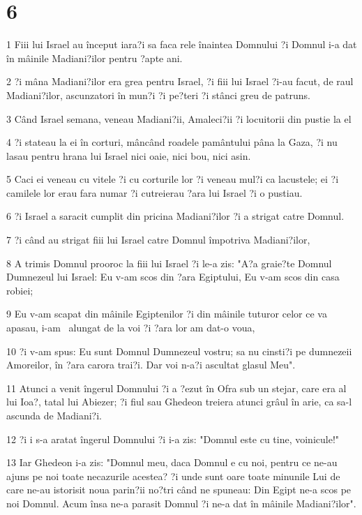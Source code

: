 \chapter{6}

\par 1 Fiii lui Israel au început iara?i sa faca rele înaintea Domnului ?i Domnul i-a dat în mâinile Madiani?ilor pentru ?apte ani.
\par 2 ?i mâna Madiani?ilor era grea pentru Israel, ?i fiii lui Israel ?i-au facut, de raul Madiani?ilor, ascunzatori în mun?i ?i pe?teri ?i stânci greu de patruns.
\par 3 Când Israel semana, veneau Madiani?ii, Amaleci?ii ?i locuitorii din pustie la el
\par 4 ?i stateau la ei în corturi, mâncând roadele pamântului pâna la Gaza, ?i nu lasau pentru hrana lui Israel nici oaie, nici bou, nici asin.
\par 5 Caci ei veneau cu vitele ?i cu corturile lor ?i veneau mul?i ca lacustele; ei ?i camilele lor erau fara numar ?i cutreierau ?ara lui Israel ?i o pustiau.
\par 6 ?i Israel a saracit cumplit din pricina Madiani?ilor ?i a strigat catre Domnul.
\par 7 ?i când au strigat fiii lui Israel catre Domnul împotriva Madiani?ilor,
\par 8 A trimis Domnul prooroc la fiii lui Israel ?i le-a zis: "A?a graie?te Domnul Dumnezeul lui Israel: Eu v-am scos din ?ara Egiptului, Eu v-am scos din casa robiei;
\par 9 Eu v-am scapat din mâinile Egiptenilor ?i din mâinile tuturor celor ce va apasau, i-am  alungat de la voi ?i ?ara lor am dat-o voua,
\par 10 ?i v-am spus: Eu sunt Domnul Dumnezeul vostru; sa nu cinsti?i pe dumnezeii Amoreilor, în ?ara carora trai?i. Dar voi n-a?i ascultat glasul Meu".
\par 11 Atunci a venit îngerul Domnului ?i a ?ezut în Ofra sub un stejar, care era al lui Ioa?, tatal lui Abiezer; ?i fiul sau Ghedeon treiera atunci grâul în arie, ca sa-l ascunda de Madiani?i.
\par 12 ?i i s-a aratat îngerul Domnului ?i i-a zis: "Domnul este cu tine, voinicule!"
\par 13 Iar Ghedeon i-a zis: "Domnul meu, daca Domnul e cu noi, pentru ce ne-au ajuns pe noi toate necazurile acestea? ?i unde sunt oare toate minunile Lui de care ne-au istorisit noua parin?ii no?tri când ne spuneau: Din Egipt ne-a scos pe noi Domnul. Acum însa ne-a parasit Domnul ?i ne-a dat în mâinile Madiani?ilor".
